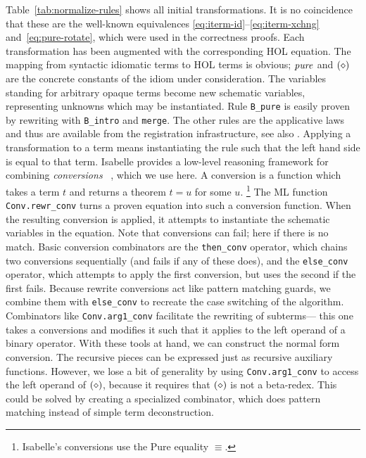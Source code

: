 Table~\ref{tab:normalize-rules} shows all initial transformations.
It is no coincidence that these are the well-known equivalences
\eqref{eq:iterm-id}--\eqref{eq:iterm-xchng} and~\eqref{eq:pure-rotate}, which
were used in the correctness proofs.
Each transformation has been augmented with the corresponding HOL equation.
The mapping from syntactic idiomatic terms to HOL terms is obvious;
$\operatorname{\mathit{pure}}$ and $(\diamond)$ are the concrete constants of the idiom under consideration.
The variables standing for arbitrary opaque terms become new schematic variables,
representing unknowns which may be instantiated.
Rule \texttt{B\_pure} is easily proven by rewriting with \texttt{B\_intro} and
\texttt{merge}.
The other rules are the applicative laws and thus are available from the
registration infrastructure, see also \todo. %
Applying a transformation to a term means instantiating the rule such that the
left hand side is equal to that term.
Isabelle provides a low-level reasoning framework for combining \emph{conversions}~
\cite{paulson83}, which we use here.
A conversion is a function which takes a term $t$ and returns a theorem
$t = u$ for some $u$.%
\footnote{Isabelle's conversions use the Pure equality $\equiv$.}
The ML function \verb+Conv.rewr_conv+ turns a proven equation into such a
conversion function.
When the resulting conversion is applied, it attempts to instantiate the
schematic variables in the equation.
Note that conversions can fail; here if there is no match.
Basic conversion combinators are the \verb+then_conv+ operator, which chains
two conversions sequentially (and fails if any of these does),
and the \verb+else_conv+ operator, which attempts to apply the first conversion,
but uses the second if the first fails.
Because rewrite conversions act like pattern matching guards, we combine them
with \verb+else_conv+ to recreate the case switching of the algorithm.
Combinators like \verb+Conv.arg1_conv+ facilitate the rewriting of subterms---%
this one takes a conversions and modifies it such that it applies to the left
operand of a binary operator.
With these tools at hand, we can construct the normal form conversion.
The recursive pieces can be expressed just as recursive auxiliary functions.
However, we lose a bit of generality by using \verb+Conv.arg1_conv+ to access
the left operand of $(\diamond)$, because it requires that $(\diamond)$ is not a
beta-redex.
This could be solved by creating a specialized combinator, which does pattern
matching instead of simple term deconstruction.

